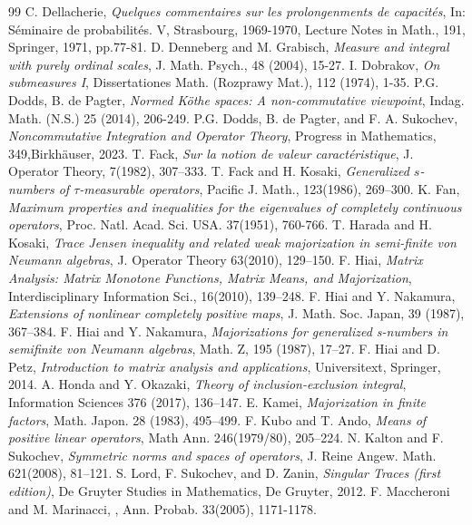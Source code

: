 \documentclass[a4paper,12pt]{amsart}
\begin{document}
\begin{thebibliography}{99}
C. Dellacherie, 
\textit{Quelques commentaires sur les prolongenments de capacit\'{e}s}, 
In: S\'{e}minaire de probabilit\'{e}s. V, Strasbourg, 1969-1970, Lecture Notes in Math., 
191, Springer, 1971, pp.77-81.
D. Denneberg and M. Grabisch, 
\textit{Measure and integral with purely ordinal scales}, 
J. Math. Psych., 48 (2004), 15-27. 
I. Dobrakov, 
\textit{On submeasures I}, 
Dissertationes Math. (Rozprawy Mat.), 112 (1974), 1-35. 
P.G. Dodds, B. de Pagter, 
\textit{Normed K\"{o}the spaces: A non-commutative viewpoint}, 
Indag. Math. (N.S.) 25 (2014), 206-249.
P.G. Dodds, B. de Pagter, and F. A. Sukochev, 
\textit{Noncommutative Integration and Operator Theory},
Progress in Mathematics, 349,Birkh\"{a}user, 2023.
T. Fack, 
\textit{Sur la notion de valeur caract\'{e}ristique}, 
J. Operator Theory, 7(1982), 307--333.
T. Fack and H. Kosaki, 
\textit{Generalized $s$-numbers of $\tau$-measurable operators}, 
Pacific J. Math., 123(1986), 269--300.
K. Fan, 
\textit{Maximum properties and inequalities for the eigenvalues of completely continuous operators}, 
Proc. Natl. Acad. Sci. USA. 37(1951), 760-766. 
T. Harada and H. Kosaki, 
\textit{Trace Jensen inequality and related weak majorization in semi-finite von Neumann algebras}, 
J. Operator Theory 63(2010), 129--150.
F. Hiai, 
\textit{Matrix Analysis: Matrix Monotone Functions, Matrix Means, and Majorization}, 
Interdisciplinary Information Sci., 16(2010), 139--248.
F. Hiai and Y. Nakamura, 
\textit{Extensions of nonlinear completely positive maps}, 
J. Math. Soc. Japan, 39 (1987), 367--384.
F. Hiai and Y. Nakamura, 
\textit{Majorizations for generalized s-numbers in semifinite von Neumann algebras}, 
Math. Z, 195 (1987), 17--27.
F. Hiai and D. Petz,
\textit{Introduction to matrix analysis and applications}, Universitext,
Springer, 2014.
A. Honda and Y. Okazaki,
\textit{Theory of inclusion-exclusion integral},
Information Sciences 376 (2017), 136--147.
E. Kamei, 
\textit{Majorization in finite factors},
Math. Japon. 28 (1983), 495--499.
F. Kubo and T. Ando,
\textit{Means of positive linear operators},
Math Ann. 246(1979/80), 205--224.
N. Kalton and  F. Sukochev, 
\textit{Symmetric norms and spaces of operators},
J. Reine Angew. Math. 621(2008), 81--121.  
S. Lord, F. Sukochev, and D. Zanin, 
\textit{Singular Traces  (first edition)},
De Gruyter Studies in Mathematics, De Gruyter, 2012. 
F. Maccheroni and M. Marinacci,
, 
Ann. Probab. 33(2005), 1171-1178.


\end{thebibliography}
\end{document}
